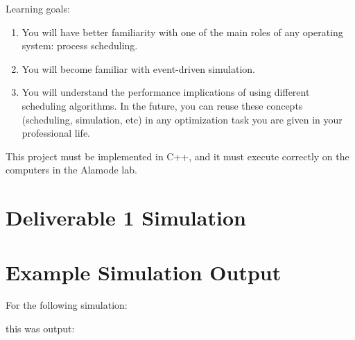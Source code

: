\documentclass[10pt]{article}
\begin{document}
Learning goals:
\begin{enumerate}
    \item You will have better familiarity with one of the main roles of any operating system: process scheduling.
    \item You will become familiar with event-driven simulation.
    \item You will understand the performance implications of using different scheduling algorithms.
    In the future, you can reuse these concepts (scheduling, simulation, etc) in any optimization task you are given in your professional life.
\end{enumerate}

This project must be implemented in C++, and it must execute correctly on the computers in the Alamode lab.







%




% 


\clearpage
\appendix
\appendixpage

\section{Deliverable 1 Simulation}
\label{app:d-one-sim}



\section{Example Simulation Output}
\label{app:example-simple-output}

For the following simulation:


this was output:




\end{document}
